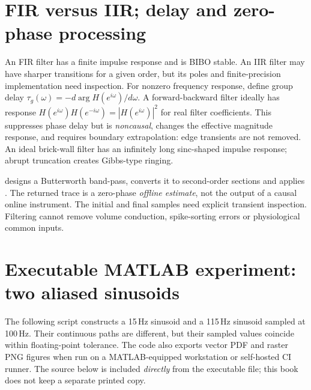 \section{FIR versus IIR; delay and zero-phase processing}
An FIR filter has a finite impulse response and is BIBO stable.
An IIR filter may have sharper transitions for a given order, but
its poles and finite-precision implementation need inspection.
For nonzero frequency response, define group delay
$\tau_g(\omega)=-d\arg H(e^{i\omega})/d\omega$.
A forward-backward filter ideally has response
$H(e^{i\omega})H(e^{-i\omega})=|H(e^{i\omega})|^2$
for real filter coefficients. This suppresses phase delay but
is \emph{noncausal}, changes the effective magnitude response,
and requires boundary extrapolation: edge transients are not removed.
An ideal brick-wall filter has an infinitely long sinc-shaped
impulse response; abrupt truncation creates Gibbs-type ringing.

\begin{example}
 designs a Butterworth band-pass,
converts it to second-order sections and applies
. The returned trace is a
zero-phase \emph{offline estimate}, not the output of a causal
online instrument. The initial and final samples need explicit
transient inspection. Filtering cannot remove volume conduction,
spike-sorting errors or physiological common inputs.
\end{example}

\section{Executable MATLAB experiment: two aliased sinusoids}
The following script constructs a 15\,Hz sinusoid and a 115\,Hz
sinusoid sampled at 100\,Hz. Their continuous paths are different,
but their sampled values coincide within floating-point tolerance.
The code also exports vector PDF and raster PNG figures when run
on a MATLAB-equipped workstation or self-hosted CI runner.
The source below is included \emph{directly} from the executable
file; this book does not keep a separate printed copy.

